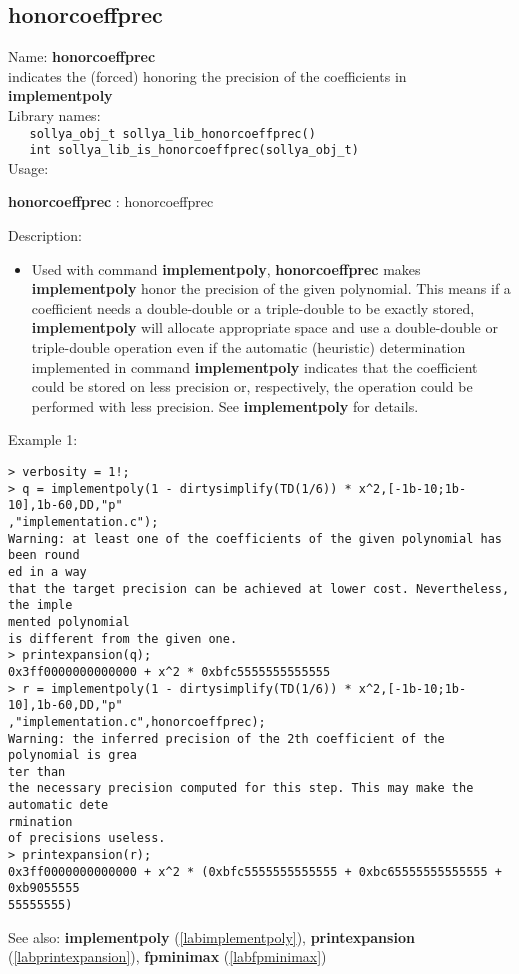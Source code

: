 \subsection{honorcoeffprec}
\label{labhonorcoeffprec}
\noindent Name: \textbf{honorcoeffprec}\\
\phantom{aaa}indicates the (forced) honoring the precision of the coefficients in \textbf{implementpoly}\\[0.2cm]
\noindent Library names:\\
\verb|   sollya_obj_t sollya_lib_honorcoeffprec()|\\
\verb|   int sollya_lib_is_honorcoeffprec(sollya_obj_t)|\\[0.2cm]
\noindent Usage: 
\begin{center}
\textbf{honorcoeffprec} : \textsf{honorcoeffprec}\\
\end{center}
\noindent Description: \begin{itemize}

\item Used with command \textbf{implementpoly}, \textbf{honorcoeffprec} makes \textbf{implementpoly} honor
   the precision of the given polynomial. This means if a coefficient
   needs a double-double or a triple-double to be exactly stored,
   \textbf{implementpoly} will allocate appropriate space and use a double-double
   or triple-double operation even if the automatic (heuristic)
   determination implemented in command \textbf{implementpoly} indicates that the
   coefficient could be stored on less precision or, respectively, the
   operation could be performed with less precision. See \textbf{implementpoly}
   for details.
\end{itemize}
\noindent Example 1: 
\begin{center}\begin{minipage}{15cm}\begin{Verbatim}[frame=single]
> verbosity = 1!;
> q = implementpoly(1 - dirtysimplify(TD(1/6)) * x^2,[-1b-10;1b-10],1b-60,DD,"p"
,"implementation.c");
Warning: at least one of the coefficients of the given polynomial has been round
ed in a way
that the target precision can be achieved at lower cost. Nevertheless, the imple
mented polynomial
is different from the given one.
> printexpansion(q);
0x3ff0000000000000 + x^2 * 0xbfc5555555555555
> r = implementpoly(1 - dirtysimplify(TD(1/6)) * x^2,[-1b-10;1b-10],1b-60,DD,"p"
,"implementation.c",honorcoeffprec);
Warning: the inferred precision of the 2th coefficient of the polynomial is grea
ter than
the necessary precision computed for this step. This may make the automatic dete
rmination
of precisions useless.
> printexpansion(r);
0x3ff0000000000000 + x^2 * (0xbfc5555555555555 + 0xbc65555555555555 + 0xb9055555
55555555)
\end{Verbatim}
\end{minipage}\end{center}
See also: \textbf{implementpoly} (\ref{labimplementpoly}), \textbf{printexpansion} (\ref{labprintexpansion}), \textbf{fpminimax} (\ref{labfpminimax})
